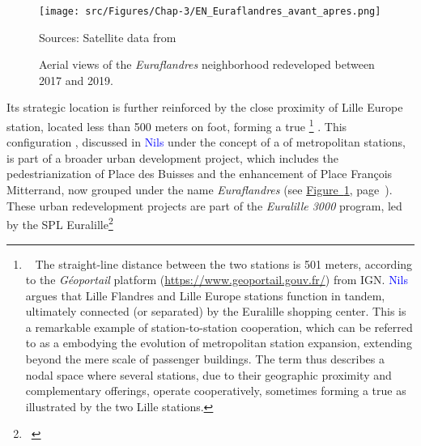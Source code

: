 \begin{refsegment}
\begin{figure}[h!]\vspace*{4pt}
    \caption{Aerial views of the \textsl{Euraflandres} neighborhood redeveloped between 2017 and 2019.}
    \label{fig-chap3:euraflandres-avant-apres}
    \centerline{\texttt{[image: src/Figures/Chap-3/EN\_Euraflandres\_avant\_apres.png]}}
    \vspace{5pt}
    \begin{flushright}\scriptsize{
    Sources: Satellite data from \textcolor{blue}{\textcite{ign_remonter_2025}}
    }\end{flushright}
\end{figure}

Its strategic location is further reinforced by the close proximity of Lille Europe station, located less than 500 meters on foot, forming a true \footnote{~
    The straight-line distance between the two stations is 501 meters, according to the \textsl{Géoportail} platform (\url{https://www.geoportail.gouv.fr/}) from \acrfull{IGN}. \textcolor{blue}{Nils} \textcolor{blue}{\textcite[415-416]{le_bot_quel_2019}} argues that Lille Flandres and Lille Europe stations function in tandem, ultimately connected (or separated) by the Euralille shopping center. This is a remarkable example of station-to-station cooperation, which can be referred to as a  embodying the  evolution of metropolitan station expansion, extending beyond the mere scale of passenger buildings. The term  thus describes a nodal space where several stations, due to their geographic proximity and complementary offerings, operate cooperatively, sometimes forming a true  as illustrated by the two Lille stations.
} \textcolor{blue}{\autocite[415-416]{le_bot_quel_2019}}. This  configuration \textcolor{blue}{\autocite[334]{bertolini_nodes_1996}}, discussed in \textcolor{blue}{Nils} \textcolor{blue}{\textcite[415-416]{le_bot_quel_2019}} under the concept of a  of metropolitan stations, is part of a broader urban development project, which includes the pedestrianization of Place des Buisses and the enhancement of Place François Mitterrand, now grouped under the name \textsl{Euraflandres} (see \hyperref[fig-chap3:euraflandres-avant-apres]{Figure~\ref{fig-chap3:euraflandres-avant-apres}}, page~\pageref{fig-chap3:euraflandres-avant-apres}). These urban redevelopment projects are part of the \textsl{Euralille 3000} program, led by the \acrfull{SPL} Euralille\footnote{~
}
\end{refsegment}

